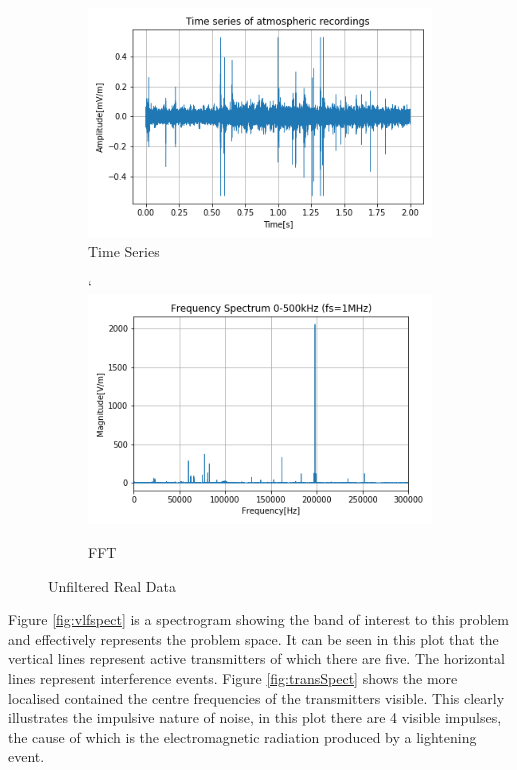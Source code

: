 \begin{figure}[h!]
    \begin{subfigure}[b]{0.5\textwidth}
        \centering
        \includegraphics[width = \textwidth]{figs/sig_character/timeseries.png}
        \caption{Time Series}
        \label{fig:realData}
    \end{subfigure}
    \begin{subfigure}[b]{0.5\textwidth}
    `   \centering
        \includegraphics[width = \textwidth]{figs/sig_character/fft_data.png}
        \caption{FFT}
        \label{fig:realFFT}
    \end{subfigure}
    \caption{Unfiltered Real Data}
\end{figure}

Figure \ref{fig:vlfspect} is a spectrogram showing the band of interest to this problem and effectively represents the problem space. It can be seen in this plot that the vertical lines represent active transmitters of which there are five. The horizontal lines represent interference events. Figure \ref{fig:transSpect} shows the more localised contained the centre frequencies of the transmitters visible. This clearly illustrates the impulsive nature of noise, in this plot there are 4 visible impulses, the cause of which is the electromagnetic radiation produced by a lightening event. 

